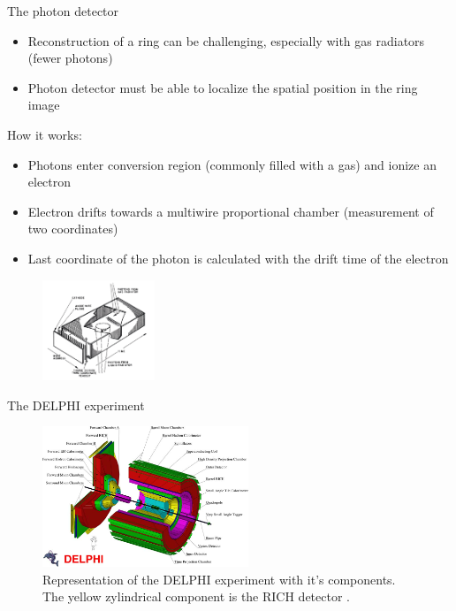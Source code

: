 \documentclass[aspectratio=1610, 10pt]{beamer}
\begin{document}
\begin{frame}{The photon detector}
  \begin{itemize}
    \item Reconstruction of a ring can be challenging, especially with gas radiators (fewer photons)
    \medskip
    \item Photon detector must be able to localize the spatial position in the ring image
  \end{itemize}
How it works:
\begin{itemize}
  \item Photons enter conversion region (commonly filled with a gas) and ionize an electron
  \medskip
  \item Electron drifts towards a multiwire proportional chamber (measurement of two coordinates)
  \medskip
  \item Last coordinate of the photon is calculated with the drift time of the electron
\end{itemize}
  \begin{figure}
    \includegraphics[width=0.3\textwidth]{images/photon_det.png}
  \end{figure}
\end{frame}

\begin{frame}{The DELPHI experiment}
  \begin{figure}
    \includegraphics[width=0.55\textwidth]{images/delphi.jpg}
    \caption{Representation of the DELPHI experiment with it's components. The yellow zylindrical component is the RICH detector \cite{delphi}.}
  \end{figure}
\end{frame}
\end{document}
